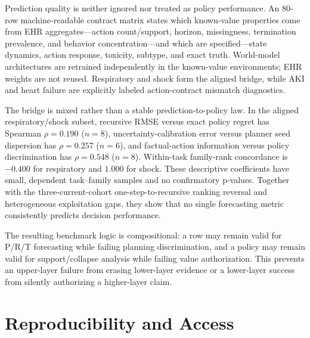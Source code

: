 \documentclass[sigconf,review]{acmart}
\begin{document}
Prediction quality is neither ignored nor treated as policy performance. An 80-row machine-readable contract matrix states which known-value properties come from EHR aggregates---action count/support, horizon, missingness, termination prevalence, and behavior concentration---and which are specified---state dynamics, action response, toxicity, subtype, and exact truth. World-model architectures are retrained independently in the known-value environments; EHR weights are not reused. Respiratory and shock form the aligned bridge, while AKI and heart failure are explicitly labeled action-contract mismatch diagnostics.

The bridge is mixed rather than a stable prediction-to-policy law. In the aligned respiratory/shock subset, recursive RMSE versus exact policy regret has Spearman $\rho=0.190$ ($n=8$), uncertainty-calibration error versus planner seed dispersion has $\rho=0.257$ ($n=6$), and factual-action information versus policy discrimination has $\rho=0.548$ ($n=8$). Within-task family-rank concordance is $-0.400$ for respiratory and $1.000$ for shock. These descriptive coefficients have small, dependent task--family samples and no confirmatory p-values. Together with the three-current-cohort one-step-to-recursive ranking reversal and heterogeneous exploitation gaps, they show that no single forecasting metric consistently predicts decision performance.

The resulting benchmark logic is compositional: a row may remain valid for P/R/T forecasting while failing planning discrimination, and a policy may remain valid for support/collapse analysis while failing value authorization. This prevents an upper-layer failure from erasing lower-layer evidence or a lower-layer success from silently authorizing a higher-layer claim.

\section{Reproducibility and Access}
\end{document}
